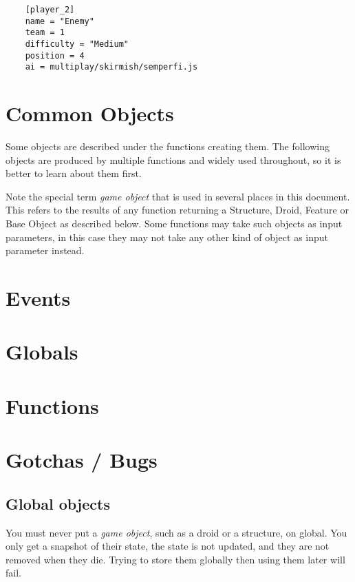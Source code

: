 \documentclass[12pt]{article}
\begin{document}
\begin{verbatim}
	[player_2]
	name = "Enemy"
	team = 1
	difficulty = "Medium"
	position = 4
	ai = multiplay/skirmish/semperfi.js
\end{verbatim}

\section{Common Objects}

Some objects are described under the functions creating them. The following objects are produced by
multiple functions and widely used throughout, so it is better to learn about them first.

Note the special term \emph{game object} that is used in several places in this document. This refers
to the results of any function returning a Structure, Droid, Feature or Base Object as described below.
Some functions may take such objects as input parameters, in this case they may not take any other kind
of object as input parameter instead.



\section{Events}



\section{Globals}

\begin{description}

\end{description}

\section{Functions}



\section{Gotchas / Bugs}

\subsection{Global objects}
You must never put a \emph{game object}, such as a droid or a structure, on global. You only get a snapshot of their state,
the state is not updated, and they are not removed when they die. Trying to store them globally then using them 
later will fail.
\end{document}
